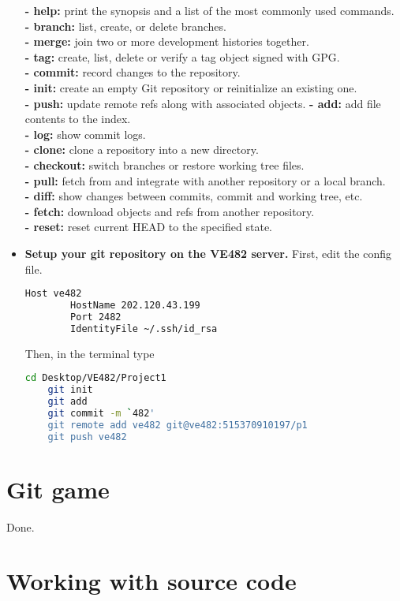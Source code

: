 \documentclass{article}
\begin{document}
\begin{spacing}{2}
\begin{itemize}
    \textbf{- help:} print the synopsis and a list of the most commonly used commands.\\
    \textbf{- branch:} list, create, or delete branches.\\
    \textbf{- merge:} join two or more development histories together.\\
    \textbf{- tag:} create, list, delete or verify a tag object signed with GPG.\\
    \textbf{- commit:} record changes to the repository.\\
    \textbf{- init:} create an empty Git repository or reinitialize an existing one.\\
    \textbf{- push:} update remote refs along with associated objects.
    \textbf{- add:} add file contents to the index.\\
    \textbf{- log:} show commit logs.\\
    \textbf{- clone:} clone a repository into a new directory.\\
    \textbf{- checkout:} switch branches or restore working tree files.\\
    \textbf{- pull:} fetch from and integrate with another repository or a local branch.\\
    \textbf{- diff:} show changes between commits, commit and working tree, etc.\\
    \textbf{- fetch:} download objects and refs from another repository.\\
    \textbf{- reset:} reset current HEAD to the specified state.
    \item \textbf{Setup your git repository on the VE482 server.}
    First, edit the config file.
    \begin{lstlisting}[language=bash]
	Host ve482
		HostName 202.120.43.199
		Port 2482
		IdentityFile ~/.ssh/id_rsa
	\end{lstlisting}
	Then, in the terminal type
    \begin{lstlisting}[language=bash]
	cd Desktop/VE482/Project1
	git init
	git add
	git commit -m `482'
	git remote add ve482 git@ve482:515370910197/p1
	git push ve482
	\end{lstlisting}
    \end{itemize}
\section{Git game}
Done.
\section{Working with source code}

\end{spacing}
\end{document}
